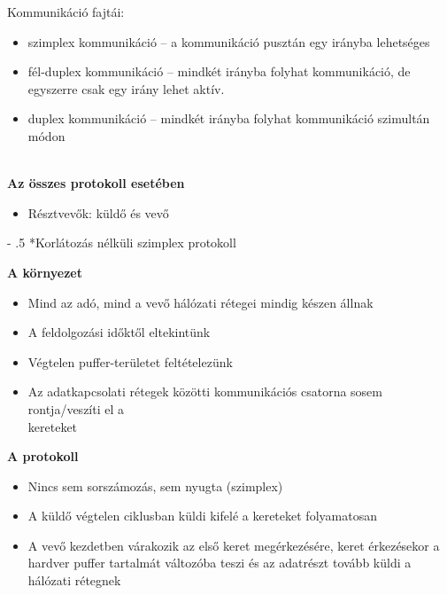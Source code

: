 \documentclass[12pt]{article}
\makeatletter
\renewcommand\paragraph{%
	\@startsection{paragraph}{4}{0mm}%
	{-\baselineskip}%
	{.5\baselineskip}%
	{\normalfont\normalsize\bfseries}}
\makeatother
\begin{document}
    \noindent Kommunikáció fajtái:
     \begin{itemize}[leftmargin=7.5mm]
        \renewcommand{\labelitemi}{$\vcenter{\hbox{\tiny$\bullet$}}$}
        \item szimplex kommunikáció – a kommunikáció pusztán egy irányba lehetséges
        \item fél-duplex kommunikáció – mindkét irányba folyhat kommunikáció, de egyszerre csak egy irány lehet aktív.
        \item duplex kommunikáció – mindkét irányba folyhat kommunikáció szimultán módon\\\
    \end{itemize}

    \noindent \textbf{\small Az összes protokoll esetében}
    \begin{itemize}
        \item Résztvevők: küldő és vevő
    \end{itemize}

  	\paragraph*{Korlátozás nélküli szimplex protokoll\\}

    \textbf{\small A környezet}
    \begin{itemize}[leftmargin=7.5mm]
        \renewcommand{\labelitemi}{$\vcenter{\hbox{\tiny$\bullet$}}$}
        \item Mind az adó, mind a vevő hálózati rétegei mindig készen állnak
        \item A feldolgozási időktől eltekintünk
        \item Végtelen puffer-területet feltételezünk
        \item Az adatkapcsolati rétegek közötti kommunikációs csatorna sosem rontja/veszíti el a\\
        kereteket
    \end{itemize}

    \noindent \textbf{\small A protokoll}
    \begin{itemize}[leftmargin=7.5mm]
        \renewcommand{\labelitemi}{$\vcenter{\hbox{\tiny$\bullet$}}$}
        \item Nincs sem sorszámozás, sem nyugta (szimplex)
        \item A küldő végtelen ciklusban küldi kifelé a kereteket folyamatosan
        \item A vevő kezdetben várakozik az első keret megérkezésére, keret érkezésekor a hardver puffer tartalmát változóba teszi és az adatrészt tovább küldi a hálózati rétegnek
    \end{itemize}
\end{document}
